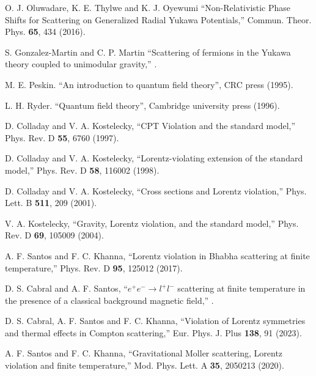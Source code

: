 \documentclass[11pt,showpacs,preprintnumbers,amsmath,amssymb,prd,nofootinbib,superscriptaddress]{revtex4-2}
\begin{document}
{\begin{thebibliography}{99}
 O. J. Oluwadare, K. E. Thylwe and K. J. Oyewumi ``Non-Relativistic Phase Shifts for Scattering on Generalized Radial Yukawa Potentials,''  {{Commun. Theor. Phys.} {\bf 65}, 434 (2016)}.

 S. Gonzalez-Martin and C. P. Martin ``Scattering of fermions in the Yukawa theory coupled to unimodular gravity,'' .

 M. E. Peskin. ``An introduction to quantum field theory'', CRC press (1995).

 L. H. Ryder. ``Quantum field theory'', Cambridge university press (1996).

 D. Colladay and V. A. Kostelecky, ``CPT Violation and the standard model,''  {{Phys. Rev. D} {\bf 55}, 6760 (1997)}.

 D. Colladay and V. A. Kostelecky, ``Lorentz-violating extension of the standard model,''  {{Phys. Rev. D} {\bf 58}, 116002 (1998)}.

 D. Colladay and V. A. Kostelecky, ``Cross sections and Lorentz violation,''  {Phys. Lett. B \textbf{511}, 209 (2001)}.

 V. A. Kostelecky, ``Gravity, Lorentz violation, and the standard model,''  {Phys. Rev. D \textbf{69}, 105009 (2004)}.

 A. F. Santos and F. C. Khanna, ``Lorentz violation in Bhabha scattering at finite temperature,''  {{Phys. Rev. D} {\bf 95}, 125012 (2017)}.

 D. S. Cabral and A. F. Santos, ``$e^{+}e^{-}\to l^{+}l^{-}$  scattering at finite temperature in the presence of a classical background magnetic field,'' .

 D. S. Cabral, A. F. Santos and F. C. Khanna, ``Violation of Lorentz symmetries and thermal effects in Compton scattering,''  {Eur. Phys. J. Plus \textbf{138}, 91 (2023)}.

 A. F. Santos and F. C. Khanna, ``Gravitational Moller scattering, Lorentz violation and finite temperature,''  {Mod. Phys. Lett. A \textbf{35}, 2050213 (2020)}.


\end{thebibliography}}
\end{document}
